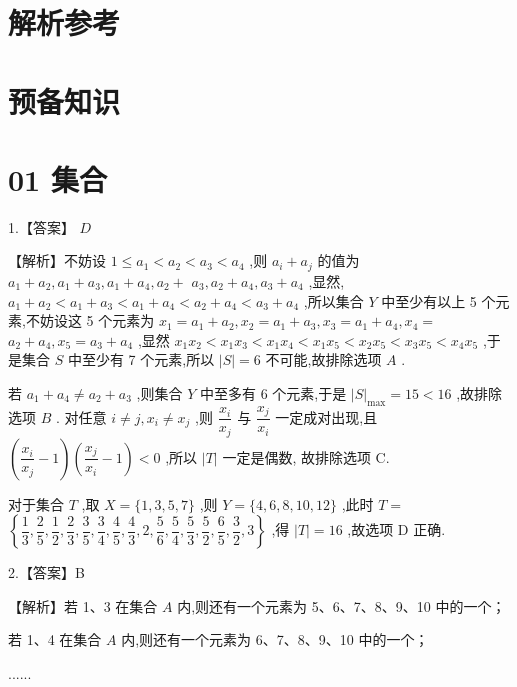 \documentclass[10pt]{article}
\begin{document}
\section*{解析参考}

\section*{预备知识}

\section*{01 集合}

1.【答案】 ${D}$

【解析】不妨设 $1 \leq  {a}_{1} < {a}_{2} < {a}_{3} < {a}_{4}$ ,则 ${a}_{i} + {a}_{j}$ 的值为 ${a}_{1} + {a}_{2},{a}_{1} + {a}_{3},{a}_{1} + {a}_{4},{a}_{2} +$  ${a}_{3},{a}_{2} + {a}_{4},{a}_{3} + {a}_{4}$ ,显然, ${a}_{1} + {a}_{2} < {a}_{1} + {a}_{3} < {a}_{1} + {a}_{4} < {a}_{2} + {a}_{4} < {a}_{3} + {a}_{4}$ ,所以集合 $Y$ 中至少有以上 5 个元素,不妨设这 5 个元素为 ${x}_{1} = {a}_{1} + {a}_{2},{x}_{2} = {a}_{1} + {a}_{3},{x}_{3} = {a}_{1} + {a}_{4},{x}_{4} =$  ${a}_{2} + {a}_{4},{x}_{5} = {a}_{3} + {a}_{4}$ ,显然 ${x}_{1}{x}_{2} < {x}_{1}{x}_{3} < {x}_{1}{x}_{4} < {x}_{1}{x}_{5} < {x}_{2}{x}_{5} < {x}_{3}{x}_{5} < {x}_{4}{x}_{5}$ ,于是集合 $S$ 中至少有 7 个元素,所以 $\left| S\right|  = 6$ 不可能,故排除选项 $A$ .

若 ${a}_{1} + {a}_{4} \neq  {a}_{2} + {a}_{3}$ ,则集合 $Y$ 中至多有 6 个元素,于是 ${\left| S\right| }_{\max } = {15} < {16}$ ,故排除选项 ${B}$ . 对任意 $i \neq  j,{x}_{i} \neq  {x}_{j}$ ,则 $\dfrac{{x}_{i}}{{x}_{j}}$ 与 $\dfrac{{x}_{j}}{{x}_{i}}$ 一定成对出现,且 $\left( {\dfrac{{x}_{i}}{{x}_{j}} - 1}\right) \left( {\dfrac{{x}_{j}}{{x}_{i}} - 1}\right)  < 0$ ,所以 $\left| T\right|$ 一定是偶数, 故排除选项 C.

对于集合 $T$ ,取 $X = \{ 1,3,5,7\}$ ,则 $Y = \{ 4,6,8,{10},{12}\}$ ,此时 $T =$  $\left\{  {\dfrac{1}{3},\dfrac{2}{5},\dfrac{1}{2},\dfrac{2}{3},\dfrac{3}{5},\dfrac{3}{4},\dfrac{4}{5},\dfrac{4}{3},2,\dfrac{5}{6},\dfrac{5}{4},\dfrac{5}{3},\dfrac{5}{2},\dfrac{6}{5},\dfrac{3}{2},3}\right\}$ ,得 $\mid  T \mid   = {16}$ ,故选项 D 正确.

2.【答案】B

【解析】若 1、3 在集合 $A$ 内,则还有一个元素为 5、6、7、8、9、10 中的一个；

若 1、4 在集合 $A$ 内,则还有一个元素为 6、7、8、9、10 中的一个；

......
\end{document}
